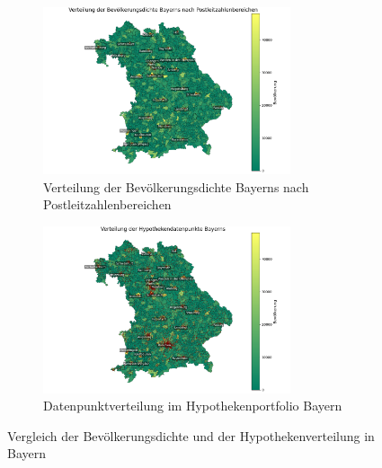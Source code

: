 \begin{figure}[htbp]
    \centering
    \begin{subfigure}{\textwidth}
        \centering
        \includegraphics[width=0.8\textwidth]{figures/Bayern_pop_plz.png}
        \caption{Verteilung der Bevölkerungsdichte Bayerns nach Postleitzahlenbereichen}
        \label{fig:bevoelkerungsdichte}
    \end{subfigure}

    \vspace{1cm} %

    \begin{subfigure}{\textwidth}
        \centering
        \includegraphics[width=0.8\textwidth]{figures/bayen_por_pop.png}
        \caption{Datenpunktverteilung im Hypothekenportfolio Bayern}
        \label{fig:hypothekenportfolio}
    \end{subfigure}
    \caption{Vergleich der Bevölkerungsdichte und der Hypothekenverteilung in Bayern}
    \label{fig:vergleich_bayern}
\end{figure}